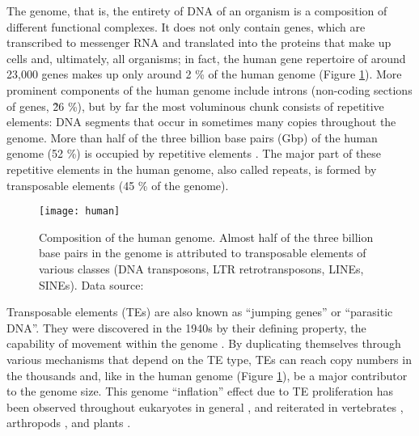 The genome, that is, the entirety of DNA of an organism is a composition
of different functional complexes. It does not only contain genes, which
are transcribed to messenger RNA and translated into the proteins that
make up cells and, ultimately, all organisms; in fact, the human gene
repertoire of around 23,000 genes makes up only around 2 \% of the human
genome \citep{Makalowski2001} (Figure \ref{fig:human-genome}). More
prominent components of the human genome include introns (non-coding
sections of genes, \~26 \%), but by far the most voluminous chunk
consists of repetitive elements: DNA segments that occur in sometimes
many copies throughout the genome.  More than half of the three billion
base pairs (Gbp) of the human genome (52 \%) is occupied by repetitive
elements \citep{Lander2001}. The major part of these repetitive elements
in the human genome, also called repeats, is formed by transposable
elements (45 \% of the genome).

\begin{figure}
\centering
\texttt{[image: human]}
\caption[Composition of the human genome]{Composition of the human
genome. Almost half of the three billion base pairs in the genome is
attributed to transposable elements of various classes (DNA transposons,
LTR retrotransposons, LINEs, SINEs). Data source: \citet{Lander2001}}
\label{fig:human-genome}
\end{figure}

Transposable elements (TEs) are also known as ``jumping genes'' or
``parasitic DNA''. They were discovered in the 1940s by their defining
property, the capability of movement within the genome
\citep{McClintock1950}. By duplicating themselves through various
mechanisms that depend on the TE type, TEs can reach copy numbers in the
thousands \citep{Petersen2018} and, like in the human genome (Figure
\ref{fig:human-genome}), be a major contributor to the genome size. This
genome ``inflation'' effect due to TE proliferation has been observed
throughout eukaryotes in general \citep{Chenais2012}, and reiterated in
vertebrates \citep{Chalopin2015}, arthropods \citep{Petersen2018}, and
plants \citep{Staton2015}. 

